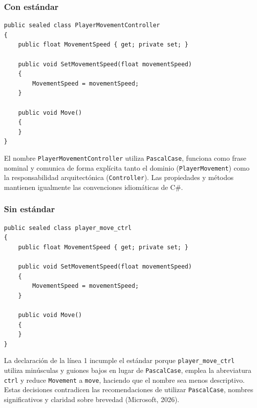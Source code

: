 \subsubsection{Con estándar}

\begin{lstlisting}[style=csharpstyle]
public sealed class PlayerMovementController
{
    public float MovementSpeed { get; private set; }

    public void SetMovementSpeed(float movementSpeed)
    {
        MovementSpeed = movementSpeed;
    }

    public void Move()
    {
    }
}
\end{lstlisting}

El nombre \texttt{PlayerMovementController} utiliza \texttt{PascalCase}, funciona como frase nominal y comunica de forma explícita tanto el dominio (\texttt{PlayerMovement}) como la responsabilidad arquitectónica (\texttt{Controller}). Las propiedades y métodos mantienen igualmente las convenciones idiomáticas de C\#.

\subsubsection{Sin estándar}

\begin{lstlisting}[style=csharpstyle]
public sealed class player_move_ctrl
{
    public float MovementSpeed { get; private set; }

    public void SetMovementSpeed(float movementSpeed)
    {
        MovementSpeed = movementSpeed;
    }

    public void Move()
    {
    }
}
\end{lstlisting}

La declaración de la línea 1 incumple el estándar porque \texttt{player\_move\_ctrl} utiliza minúsculas y guiones bajos en lugar de \texttt{PascalCase}, emplea la abreviatura \texttt{ctrl} y reduce \texttt{Movement} a \texttt{move}, haciendo que el nombre sea menos descriptivo. Estas decisiones contradicen las recomendaciones de utilizar \texttt{PascalCase}, nombres significativos y claridad sobre brevedad (Microsoft, 2026).

